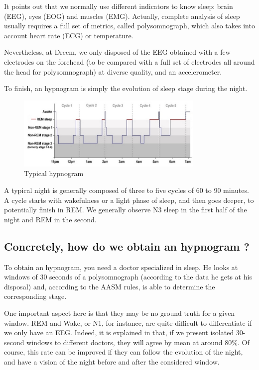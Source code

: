 \documentclass[12pt]{report}
\begin{document}
It points out that we normally use different indicators to know sleep: brain (EEG), eyes (EOG) and muscles (EMG). Actually, complete analysis of sleep usually requires a full set of metrics, called polysomnograph, which also takes into account heart rate (ECG) or temperature.

Nevertheless, at Dreem, we only disposed of the EEG obtained with a few electrodes on the forehead (to be compared with a full set of electrodes all around the head for polysomnograph) at diverse quality, and an accelerometer.

To finish, an hypnogram is simply the evolution of sleep stage during the night. 

\begin{figure}[H]
\centering
\includegraphics[width=0.8\textwidth]{img/chap2/hypno_net.png}
\caption{\label{fig:hypno_net}Typical hypnogram}
\end{figure}

A typical night is generally composed of three to five cycles of 60 to 90 minutes. A cycle starts with wakefulness or a light phase of sleep, and then goes deeper, to potentially finish in REM. We generally observe N3 sleep in the first half of the night and REM in the second.

\subsection{Concretely, how do we obtain an hypnogram ?}

To obtain an hypnogram, you need a doctor specialized in sleep. He looks at windows of 30 seconds of a polysomnograph (according to the data he gets at his disposal) and, according to the AASM rules, is able to determine the corresponding stage.

One important aspect here is that they may be no ground truth for a given window. REM and Wake, or N1, for instance, are quite difficult to differentiate if we only have an EEG. Indeed, it is explained in \cite{basner2008inter} that, if we present isolated 30-second windows to different doctors, they will agree by mean at around 80\%. Of course, this rate can be improved if they can follow the evolution of the night, and have a vision of the night before and after the considered window.
\end{document}
